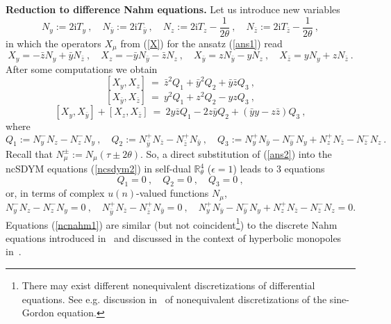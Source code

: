 \documentclass[a4paper,11pt]{article}
\numberwithin{equation}{section}
\def\th{\theta}
\def\e{\epsilon}
\def\m{\mu}
\newcommand{\im}{\mathrm{i}}
\newcommand{\zb}{{\bar{z}}}
\newcommand{\yb}{{\bar{y}}}
\newcommand{\rct}{{\mathbb{R}^4_\theta}}
\begin{document}
\medskip

{\bf Reduction to  difference Nahm equations.}
Let us introduce new variables
\begin{equation}\label{nnnn}
N_y := 2\im T_y\ ,\quad N_\yb := 2\im T_\yb \ ,
\quad N_z := 2\im T_z - \frac{1}{2\th}   \ ,\quad 
 N_\zb := 2\im T_\zb - \frac{1}{2\th}   \ ,
\end{equation}
in which  the operators $X_\m$ from (\ref{X}) for the ansatz (\ref{ans1})
read
\begin{equation}\label{ans2}
X_y = -\zb N_y + \yb N_\zb\ ,\quad X_z =  -\yb N_\yb - \zb N_z\ ,\quad
X_\yb =  z N_\yb - y N_z \ ,\quad X_\zb = y N_y + z N_\zb \ .
\end{equation}
After some computations we obtain
$$
[X_{y}, X_{z} ]\ =\ \zb^2Q_1 + \yb^2 Q_2 + \yb\zb Q_3 \ , 
$$
$$
[X_{\yb}, X_{\zb} ]\ =\ y^2Q_1 + z^2 Q_2 - yz Q_3 \ ,
$$ 
\begin{equation}\label{ncsdym3} 
[X_{y}, X_{\yb}]+ [X_{z}, X_{\zb} ]\ = \   2y\zb Q_1 - 2z\yb Q_2 + (\yb y - z\zb ) Q_3 \ ,
\end{equation}
where
\begin{equation}\label{qqq}
Q_1:= N_y^-N_z - N_z^-N_y \ , \quad
Q_2:= N_\yb^+N_\zb - N_\zb^+N_\yb \ , \quad
Q_3:= N_y^+N_\yb - N_\yb^-N_y + N_z^+N_\zb -  N_\zb^- N_z  \ .
\end{equation}
Recall that $N_\mu^\pm := {N}_{\m}(\tau \pm 2\th)$.
So, a direct substitution of (\ref{ans2}) into the ncSDYM equations
(\ref{ncsdym2}) in self-dual $\rct$ ($\e =1$) leads to 3 equations 
\begin{equation}\label{ncnahm}
Q_1=0\ ,\quad Q_2=0\ ,\quad Q_3=0\ ,
\end{equation}
or, in terms of complex $u(n)$-valued functions $N_\m$,
\begin{equation}\label{ncnahm1}
N_y^-N_z - N_z^-N_y=0 \ , \quad
N_\yb^+N_\zb - N_\zb^+N_\yb =0 \ , \quad
N_y^+N_\yb - N_\yb^-N_y + N_z^+N_\zb -  N_\zb^- N_z=0.  
\end{equation}
Equations (\ref{ncnahm1}) are similar (but not coincident\footnote{
There may exist different nonequivalent discretizations of differential 
equations. See e.g. discussion in~\cite{bob} of nonequivalent 
discretizations of the sine-Gordon equation.}) 
to the discrete Nahm equations introduced in~\cite{BA} and discussed in the context 
of hyperbolic monopoles in~\cite{MS, Ward}.
\end{document}
